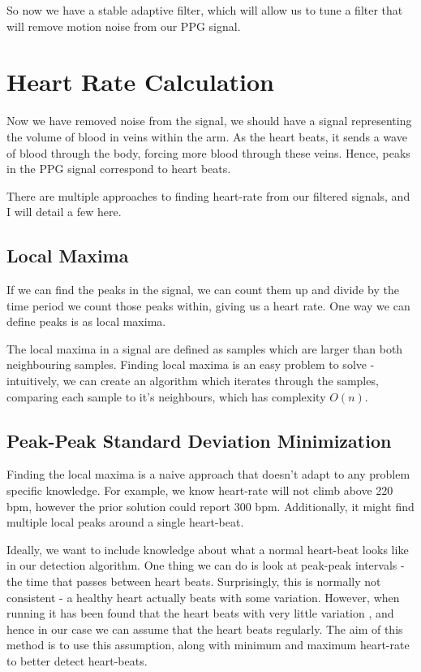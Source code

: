 \documentclass[12pt,a4paper,twoside,openright]{report}
\begin{document}
So now we have a stable adaptive filter, which will allow us to tune a filter
that will remove motion noise from our PPG signal.

\section{Heart Rate Calculation}

Now we have removed noise from the signal, we should have a signal 
representing the volume of blood in veins within the arm. As the heart beats,
it sends a wave of blood through the body, forcing more blood through these
veins. Hence, peaks in the PPG signal correspond to heart beats. 

There are multiple approaches to finding heart-rate from our filtered
signals, and I will detail a few here.

\subsection{Local Maxima}

If we can find the peaks in the signal, we can count them up and divide by the
time period we count those peaks within, giving us a heart rate. One way we
can define peaks is as local maxima.

The local maxima in a signal are defined as samples which are larger than both
neighbouring samples. Finding local maxima is an easy problem to solve - 
intuitively, we can create an algorithm which iterates through the samples,
comparing each sample to it's neighbours, which has complexity \(O(n)\).

\subsection{Peak-Peak Standard Deviation Minimization}

Finding the local maxima is a naive approach that doesn't adapt to any problem
specific knowledge. For example, we know heart-rate will not climb above 220
bpm, however the prior solution could report 300 bpm. Additionally, it might
find multiple local peaks around a single heart-beat. 

Ideally, we want to include knowledge about what a normal heart-beat looks
like in our detection algorithm. One thing we can do is look at peak-peak
intervals - the time that passes between heart beats. Surprisingly, this is
normally not consistent - a healthy heart actually beats with some
variation. However, when running it has been found that the heart beats with
very little variation \cite{michael17}, and hence in our case we can assume that the heart
beats regularly. The aim of this method is to use this assumption, along with
minimum and maximum heart-rate to better detect heart-beats.
\end{document}
